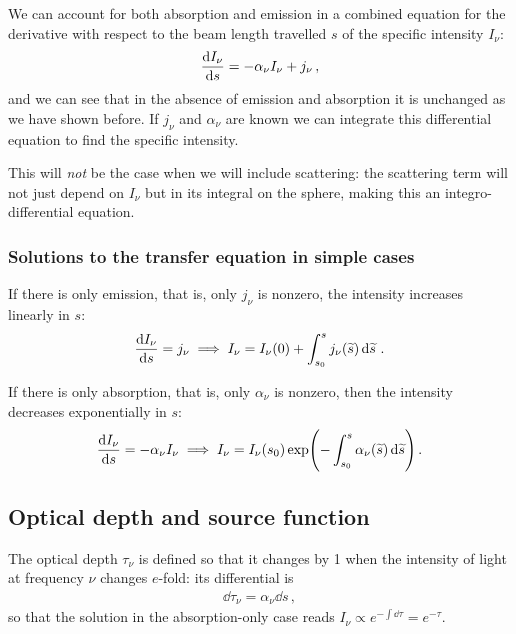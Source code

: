 \documentclass[main.tex]{subfiles}
\begin{document}
We can account for both absorption and emission in a combined equation for the derivative with respect to the beam length travelled \(s\) of the specific intensity \(I_{\nu }\): 
%
\begin{align}
\dv{I_{\nu }}{s} = - \alpha_{\nu } I_{\nu } + j_{\nu }
\,,
\end{align}
%
and we can see that in the absence of emission and absorption it is unchanged as we have shown before.
If \(j_{\nu }\) and \(\alpha_{\nu }\) are known we can integrate this differential equation to find the specific intensity. 

This will \emph{not} be the case when we will include scattering: the scattering term will not just depend on \(I_{\nu }\) but in its integral on the sphere, making this an integro-differential equation. 

\subsubsection{Solutions to the transfer equation in simple cases}

If there is only emission, that is, only \(j_{\nu }\) is nonzero, the intensity increases linearly in \(s\): 
%
\begin{align}
\dv{I_{\nu }}{s} = j_{\nu } \implies 
I_{\nu } = I_{\nu }(0) + \int_{s_0 }^{s} j_{\nu } (\widetilde{s}) \dd{\widetilde{s}} 
\,.
\end{align}

If there is only absorption, that is, only \(\alpha_{\nu }\) is nonzero, then the intensity decreases exponentially in \(s\):
%
\begin{align}
\dv{I_{\nu }}{s} = - \alpha_{\nu } I_{\nu } \implies 
I_{\nu } = I_{\nu }(s_0 ) \exp(- \int_{s_0 }^{s} \alpha_{\nu }(\widetilde{s}) \dd{\widetilde{s}})
\,.
\end{align}

\subsection{Optical depth and source function}

The optical depth \(\tau_{\nu }\) is defined so that it changes by 1 when the intensity of light at frequency \(\nu \) changes \(e\)-fold: its differential is
%
\begin{align}
\dd{\tau_{\nu }} = \alpha_{\nu } \dd{s}
\,,
\end{align}
%
so that the solution in the absorption-only case reads \(I_{\nu } \propto e^{-\int \dd{\tau }} = e^{-\tau }\).
\end{document}
